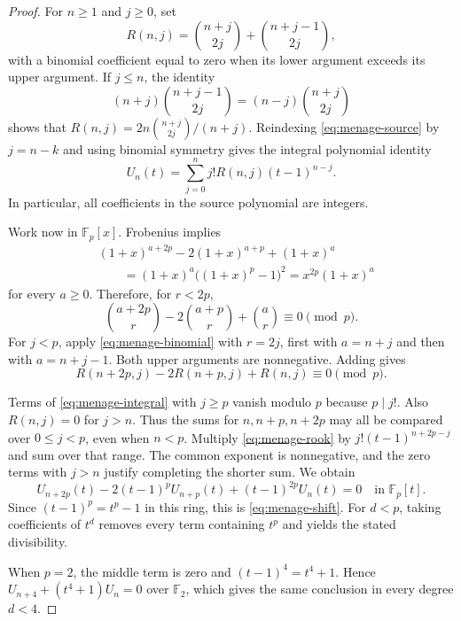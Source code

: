 \begin{proof}
For $n\geq1$ and $j\geq0$, set
\[
 R(n,j)=\binom{n+j}{2j}+\binom{n+j-1}{2j},
\]
with a binomial coefficient equal to zero when its lower argument exceeds its
upper argument. If $j\leq n$, the identity
\[
 (n+j)\binom{n+j-1}{2j}=(n-j)\binom{n+j}{2j}
\]
shows that $R(n,j)=2n\binom{n+j}{2j}/(n+j)$. Reindexing
\eqref{eq:menage-source} by $j=n-k$ and using binomial symmetry gives the
integral polynomial identity
\begin{equation}\label{eq:menage-integral}
 U_n(t)=\sum_{j=0}^{n}j!R(n,j)(t-1)^{n-j}.
\end{equation}
In particular, all coefficients in the source polynomial are integers.

Work now in $\mathbb F_p[x]$. Frobenius implies
\[
\begin{aligned}
 &(1+x)^{a+2p}-2(1+x)^{a+p}+(1+x)^a\\
 &\qquad=(1+x)^a\bigl((1+x)^p-1\bigr)^2
 =x^{2p}(1+x)^a
\end{aligned}
\]
for every $a\geq0$. Therefore, for $r<2p$,
\begin{equation}\label{eq:menage-binomial}
 \binom{a+2p}{r}-2\binom{a+p}{r}+\binom ar\equiv0\pmod p.
\end{equation}
For $j<p$, apply \eqref{eq:menage-binomial} with $r=2j$, first with $a=n+j$
and then with $a=n+j-1$. Both upper arguments are nonnegative. Adding gives
\begin{equation}\label{eq:menage-rook}
 R(n+2p,j)-2R(n+p,j)+R(n,j)\equiv0\pmod p.
\end{equation}

Terms of \eqref{eq:menage-integral} with $j\geq p$ vanish modulo $p$ because
$p\mid j!$. Also $R(n,j)=0$ for $j>n$. Thus the sums for $n,n+p,n+2p$ may
all be compared over $0\leq j<p$, even when $n<p$. Multiply
\eqref{eq:menage-rook} by $j!(t-1)^{n+2p-j}$ and sum over that range.
The common exponent is nonnegative, and the zero terms with $j>n$ justify
completing the shorter sum. We obtain
\[
 U_{n+2p}(t)-2(t-1)^pU_{n+p}(t)+(t-1)^{2p}U_n(t)=0
 \quad\text{in }\mathbb F_p[t].
\]
Since $(t-1)^p=t^p-1$ in this ring, this is \eqref{eq:menage-shift}.
For $d<p$, taking coefficients of $t^d$ removes every term containing $t^p$
and yields the stated divisibility.

When $p=2$, the middle term is zero and $(t-1)^4=t^4+1$.
Hence $U_{n+4}+(t^4+1)U_n=0$ over $\mathbb F_2$, which gives the same
conclusion in every degree $d<4$.
\end{proof}

